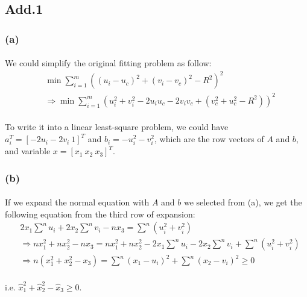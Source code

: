 \subsection*{Add.1}
\subsubsection*{(a)}
\paragraph{}
We could simplify the original fitting problem as follow:
\begin{align*}
&\min \sum_{i=1}^{m}((u_i-u_c)^2 +(v_i-v_c)^2-R^2)^2 \\
&\Rightarrow \min \sum_{i=1}^{m}(u_i^2 +v_i^2 - 2u_iu_c -2v_iv_c +(v_c^2 +u_c^2 -R^2))^2
\end{align*}
\paragraph{}
To write it into a linear least-square problem, we could have $a_i^T = [-2u_i -2v_i \ 1]^T$ and $b_i=-u_i^2 -v_i^2$, which are the row vectors of $A$ and $b$, and variable $x = [x_1\  x_2\  x_3]^T$.
\subsubsection*{(b)}
\paragraph{}
If we expand the normal equation with $A$ and $b$ we selected from (a), we get the following equation from the third row of expansion:
\begin{align*}
&2x_1\sum^n u_i+2x_2\sum^n v_i -nx_3= \sum^n(u_i^2+v_i^2) \\
&\Rightarrow nx_1^2+nx^2_2-nx_3=nx_1^2+nx^2_2-2x_1\sum^n u_i-2x_2\sum^n v_i+ \sum^n(u_i^2+v_i^2)\\
&\Rightarrow n(x_1^2+x^2_2-x_3) = \sum^n(x_1-u_i)^2 + \sum^n(x_2-v_i)^2 \geq 0
\end{align*}
\paragraph{}
i.e. $\hat{x}_1^2 +\hat{x}_2^2-\hat{x}_3 \geq 0$.
